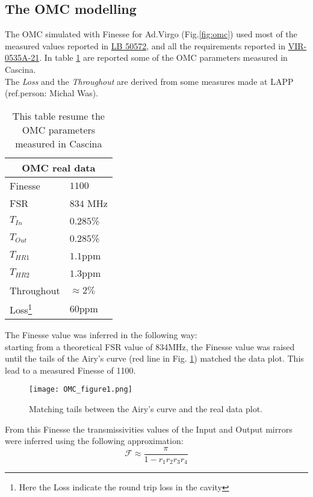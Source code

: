 \documentclass[color,DIV12,pdftex,a4paper]{virgo-note}
\begin{document}
\subsection{The OMC modelling}\label{omc}
The OMC simulated with Finesse for Ad.Virgo (Fig.\ref{fig:omc}) used most of the measured values reported in \href{https://logbook.virgo-gw.eu/virgo/?r=50572}{LB 50572}, and all the requirements reported in \href{https://tds.virgo-gw.eu/?content=3\&r=18807}{VIR-0535A-21}. In table \ref{tab:tomc} are reported some of the OMC parameters measured in Cascina. \\
The \textit{Loss} and the \textit{Throughout} are derived from some measures made at LAPP (ref.person: Michal Was).
\begin{table}[t]
\begin{center}
\begin{tabular}{ |l|l| }
  \hline
  \multicolumn{2}{|c|}{OMC real data} \\
  \hline
  Finesse & $1100$ \\
  FSR & $834$ MHz \\
  $T_{In}$ & $0.285$\% \\
  $T_{Out}$ & $0.285$\% \\
  $T_{HR1}$ & $1.1$ppm \\
  $T_{HR2}$ & $1.3$ppm  \\
  Throughout & $\approx2\%$\\
  Loss\footnote{Here the Loss indicate the round trip loss in the cavity} & $60$ppm\\
  \hline
\end{tabular}
\caption{This table resume the OMC parameters measured in Cascina}
\label{tab:tomc}
\end{center}
\end{table}
The Finesse value was inferred in the following way:\\ starting from a theoretical FSR value of 834MHz, the Finesse value was raised until the tails of the Airy's curve (red line in Fig. \ref{fig:airy}) matched the data plot. This lead to a measured Finesse of 1100.
\begin{figure}[h!]
    \centering
    \texttt{[image: OMC\_figure1.png]}
    \caption{Matching tails between the Airy's curve and the real data plot.}
    \label{fig:airy}
\end{figure}
From this Finesse the transmissivities values of the Input and Output mirrors were inferred using the following approximation:
\begin{equation}
    \mathcal{F}\approx \frac{\pi}{1-r_1r_2r_3r_4}
\end{equation}
\end{document}
